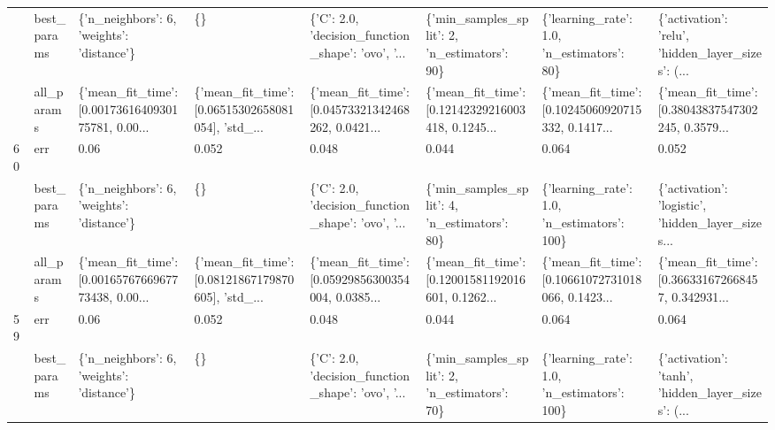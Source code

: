 \begin{tabular}{llllllll}
   & best\_params &          \{'n\_neighbors': 6, 'weights': 'distance'\} &                                                 \{\} &  \{'C': 2.0, 'decision\_function\_shape': 'ovo', '... &       \{'min\_samples\_split': 2, 'n\_estimators': 90\} &         \{'learning\_rate': 1.0, 'n\_estimators': 80\} &  \{'activation': 'relu', 'hidden\_layer\_sizes': (... \\
   & all\_params &  \{'mean\_fit\_time': [0.0017361640930175781, 0.00... &  \{'mean\_fit\_time': [0.06515302658081054], 'std\_... &  \{'mean\_fit\_time': [0.04573321342468262, 0.0421... &  \{'mean\_fit\_time': [0.12142329216003418, 0.1245... &  \{'mean\_fit\_time': [0.10245060920715332, 0.1417... &  \{'mean\_fit\_time': [0.38043837547302245, 0.3579... \\
60 & err &                                               0.06 &                                              0.052 &                                              0.048 &                                              0.044 &                                              0.064 &                                              0.052 \\
   & best\_params &          \{'n\_neighbors': 6, 'weights': 'distance'\} &                                                 \{\} &  \{'C': 2.0, 'decision\_function\_shape': 'ovo', '... &       \{'min\_samples\_split': 4, 'n\_estimators': 80\} &        \{'learning\_rate': 1.0, 'n\_estimators': 100\} &  \{'activation': 'logistic', 'hidden\_layer\_sizes... \\
   & all\_params &  \{'mean\_fit\_time': [0.0016576766967773438, 0.00... &  \{'mean\_fit\_time': [0.08121867179870605], 'std\_... &  \{'mean\_fit\_time': [0.05929856300354004, 0.0385... &  \{'mean\_fit\_time': [0.12001581192016601, 0.1262... &  \{'mean\_fit\_time': [0.10661072731018066, 0.1423... &  \{'mean\_fit\_time': [0.366331672668457, 0.342931... \\
59 & err &                                               0.06 &                                              0.052 &                                              0.048 &                                              0.044 &                                              0.064 &                                              0.064 \\
   & best\_params &          \{'n\_neighbors': 6, 'weights': 'distance'\} &                                                 \{\} &  \{'C': 2.0, 'decision\_function\_shape': 'ovo', '... &       \{'min\_samples\_split': 2, 'n\_estimators': 70\} &        \{'learning\_rate': 1.0, 'n\_estimators': 100\} &  \{'activation': 'tanh', 'hidden\_layer\_sizes': (... \\

\end{tabular}
